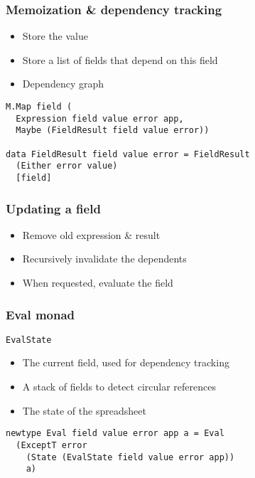 \documentclass{beamer}
\begin{document}
\begin{frame}[fragile]
\frametitle{Memoization \& dependency tracking}
\begin{itemize}
	\item Store the value
	\item Store a list of fields that depend on this field
	\item Dependency graph
\end{itemize}

\begin{verbatim}
M.Map field (
  Expression field value error app,
  Maybe (FieldResult field value error))

data FieldResult field value error = FieldResult
  (Either error value)
  [field]
\end{verbatim}
\end{frame}

\begin{frame}
\frametitle{Updating a field}
\begin{itemize}
	\item Remove old expression \& result
	\item Recursively invalidate the dependents
	\item When requested, evaluate the field
\end{itemize}
\end{frame}

\begin{frame}[fragile]
\frametitle{Eval monad}

\texttt{EvalState}
\begin{itemize}
	\item The current field, used for dependency tracking
	\item A stack of fields to detect circular references
	\item The state of the spreadsheet
\end{itemize}

\begin{verbatim}
newtype Eval field value error app a = Eval
  (ExceptT error
    (State (EvalState field value error app))
    a)
\end{verbatim}
\end{frame}

\frame{\titlepage}
\end{document}

